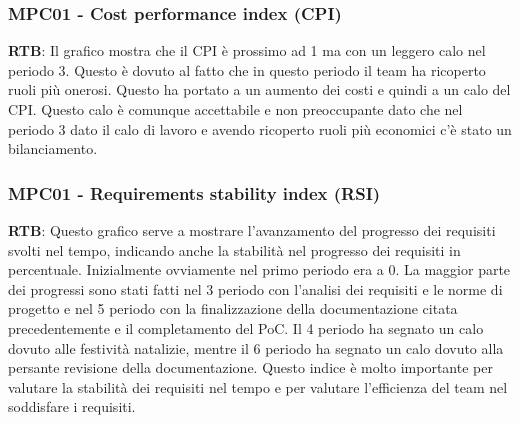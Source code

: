 \documentclass[10pt]{article}
\begin{document}
\begin{justify}
\subsubsection{MPC01 - Cost performance index (CPI)}
\textbf{RTB}: Il grafico mostra che il CPI è prossimo ad 1 ma con un leggero calo nel periodo 3. Questo è dovuto al fatto che in questo periodo il team ha ricoperto 
ruoli più onerosi. Questo ha portato a un aumento dei costi e quindi a un calo del CPI. Questo calo è comunque accettabile e non preoccupante dato che nel periodo 
3 dato il calo di lavoro e avendo ricoperto ruoli più economici c'è stato un bilanciamento.

\subsubsection{MPC01 - Requirements stability index (RSI)}
\textbf{RTB}: Questo grafico serve a mostrare l'avanzamento del progresso dei requisiti svolti nel tempo, indicando anche la stabilità nel progresso dei requisiti 
in percentuale. Inizialmente ovviamente nel primo periodo era a 0. La maggior parte dei progressi sono stati fatti nel 3 periodo con l'analisi dei requisiti e le norme 
di progetto e nel 5 periodo con la finalizzazione della documentazione citata precedentemente e il completamento del PoC. Il 4 periodo ha segnato un calo dovuto alle 
festività natalizie, mentre il 6 periodo ha segnato un calo dovuto alla persante revisione della documentazione. Questo indice è molto importante per valutare la 
stabilità dei requisiti nel tempo e per valutare l'efficienza del team nel soddisfare i requisiti.


\end{justify}
\end{document}
